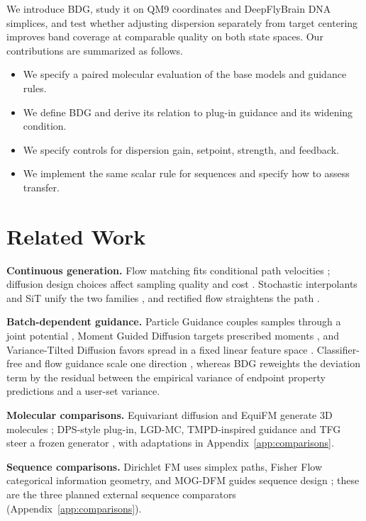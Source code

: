 \documentclass{article}
\begin{document}
We introduce BDG, study it on QM9 coordinates and DeepFlyBrain DNA simplices, and test whether adjusting dispersion separately from target centering improves band coverage at comparable quality on both state spaces. Our contributions are summarized as follows.
\begin{itemize}
\item We specify a paired molecular evaluation of the base models and guidance rules.
\item We define BDG and derive its relation to plug-in guidance and its widening condition.
\item We specify controls for dispersion gain, setpoint, strength, and feedback.
\item We implement the same scalar rule for sequences and specify how to assess transfer.
\end{itemize}

\section{Related Work}
\textbf{Continuous generation.} Flow matching fits conditional path velocities \citep{lipman2022flow}; diffusion design choices affect sampling quality and cost \citep{karras2022elucidating}. Stochastic interpolants and SiT unify the two families \citep{albergo2025stochastic,ma2024sit}, and rectified flow straightens the path \citep{liu2022flow}.

\textbf{Batch-dependent guidance.} Particle Guidance couples samples through a joint potential \citep{corso2024particle}, Moment Guided Diffusion targets prescribed moments \citep{mgd2026moment}, and Variance-Tilted Diffusion favors spread in a fixed linear feature space \citep{vtd2026variance}. Classifier-free and flow guidance scale one direction \citep{ho2022classifier,zheng2023guided}, whereas BDG reweights the deviation term by the residual between the empirical variance of endpoint property predictions and a user-set variance.

\textbf{Molecular comparisons.} Equivariant diffusion and EquiFM generate 3D molecules \citep{hoogeboom2022equivariant,song2023equifm}; DPS-style plug-in, LGD-MC, TMPD-inspired guidance and TFG steer a frozen generator \citep{chung2023dps,song2023lgd,boys2024tmpd,ye2024tfg}, with adaptations in Appendix~\ref{app:comparisons}.

\textbf{Sequence comparisons.} Dirichlet FM uses simplex paths, Fisher Flow categorical information geometry, and MOG-DFM guides sequence design \citep{stark2024dirichlet,davis2024fisher,chen2025multi}; these are the three planned external sequence comparators (Appendix~\ref{app:comparisons}).
\end{document}
